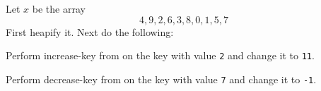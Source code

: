 Let $x$ be the array
\[
4, 9, 2, 6, 3, 8, 0, 1, 5, 7
\]
First heapify it.
Next do the following:
\begin{tightlist}
  \item Perform increase-key from on the key with value \texttt{2}
  and change it to \texttt{11}.
  \item Perform decrease-key from on the key with value
  \texttt{7} and change it to \texttt{-1}.
\end{tightlist}
